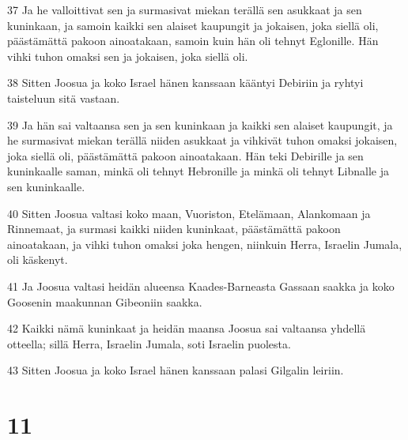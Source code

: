 \par 37 Ja he valloittivat sen ja surmasivat miekan terällä sen asukkaat ja sen kuninkaan, ja samoin kaikki sen alaiset kaupungit ja jokaisen, joka siellä oli, päästämättä pakoon ainoatakaan, samoin kuin hän oli tehnyt Eglonille. Hän vihki tuhon omaksi sen ja jokaisen, joka siellä oli.
\par 38 Sitten Joosua ja koko Israel hänen kanssaan kääntyi Debiriin ja ryhtyi taisteluun sitä vastaan.
\par 39 Ja hän sai valtaansa sen ja sen kuninkaan ja kaikki sen alaiset kaupungit, ja he surmasivat miekan terällä niiden asukkaat ja vihkivät tuhon omaksi jokaisen, joka siellä oli, päästämättä pakoon ainoatakaan. Hän teki Debirille ja sen kuninkaalle saman, minkä oli tehnyt Hebronille ja minkä oli tehnyt Libnalle ja sen kuninkaalle.
\par 40 Sitten Joosua valtasi koko maan, Vuoriston, Etelämaan, Alankomaan ja Rinnemaat, ja surmasi kaikki niiden kuninkaat, päästämättä pakoon ainoatakaan, ja vihki tuhon omaksi joka hengen, niinkuin Herra, Israelin Jumala, oli käskenyt.
\par 41 Ja Joosua valtasi heidän alueensa Kaades-Barneasta Gassaan saakka ja koko Goosenin maakunnan Gibeoniin saakka.
\par 42 Kaikki nämä kuninkaat ja heidän maansa Joosua sai valtaansa yhdellä otteella; sillä Herra, Israelin Jumala, soti Israelin puolesta.
\par 43 Sitten Joosua ja koko Israel hänen kanssaan palasi Gilgalin leiriin.

\chapter{11}

